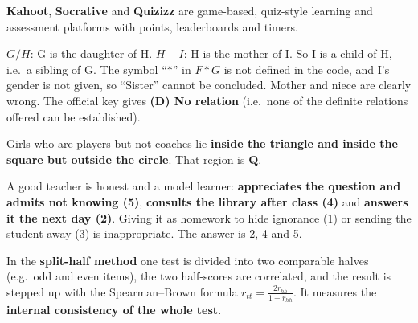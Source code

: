 \textbf{Kahoot}, \textbf{Socrative} and \textbf{Quizizz} are game-based, quiz-style learning and assessment platforms with points, leaderboards and timers.

$G/H$: G is the daughter of H. $H-I$: H is the mother of I. So I is a child of H, i.e.\ a sibling of G. The symbol ``$*$'' in $F*G$ is not defined in the code, and I's gender is not given, so ``Sister'' cannot be concluded. Mother and niece are clearly wrong. The official key gives \textbf{(D) No relation} (i.e.\ none of the definite relations offered can be established).


Girls who are players but not coaches lie \textbf{inside the triangle and inside the square but outside the circle}. That region is \textbf{Q}.

A good teacher is honest and a model learner: \textbf{appreciates the question and admits not knowing (5)}, \textbf{consults the library after class (4)} and \textbf{answers it the next day (2)}. Giving it as homework to hide ignorance (1) or sending the student away (3) is inappropriate. The answer is 2, 4 and 5.

In the \textbf{split-half method} one test is divided into two comparable halves (e.g.\ odd and even items), the two half-scores are correlated, and the result is stepped up with the Spearman--Brown formula $r_{tt}=\frac{2r_{hh}}{1+r_{hh}}$. It measures the \textbf{internal consistency of the whole test}.

